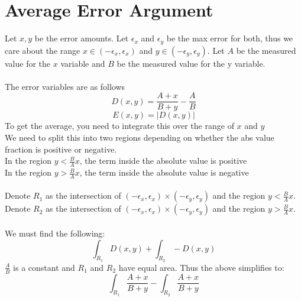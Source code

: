 \section{Average Error Argument}

Let $x,y$ be the error amounts. Let $\epsilon_x$ and $\epsilon_y$ be the max error for both, thus we care about the range $x \in (-\epsilon_x,\epsilon_x)$ and $y \in (-\epsilon_y,\epsilon_y)$. Let $A$ be the measured value for the $x$ variable and $B$ be the measured value for the y variable.\\
\\
The error variables are as follows
\[
D(x,y) = \frac{A + x}{B + y} - \frac{A}{B}
\]
\[
E(x,y) = |D(x,y)|
\]
To get the average, you need to integrate this over the range of $x$ and $y$\\
We need to split this into two regions depending on whether the abs value fraction is positive or negative. \\
In the region $y < \frac{B}{A} x$, the term inside the absolute value is positive\\
In the region $y > \frac{B}{A} x$, the term inside the absolute value is negative\\
\\
Denote $R_1$ as the intersection of $(-\epsilon_x,\epsilon_x) \times (-\epsilon_y,\epsilon_y)$ and the region $y < \frac{B}{A} x$. \\
Denote $R_2$ as the intersection of $(-\epsilon_x,\epsilon_x) \times (-\epsilon_y,\epsilon_y)$ and the region $y > \frac{B}{A} x$. \\
\\
We must find the following:
\[
\int_{R_1} D(x,y) + \int_{R_2} -D(x,y)
\]
$\frac{A}{B}$ is a constant and $R_1$ and $R_2$ have equal area. Thus the above simplifies to:
\[
\int_{R_1} \frac{A + x}{B + y} - \int_{R_2} \frac{A + x}{B + y}
\]